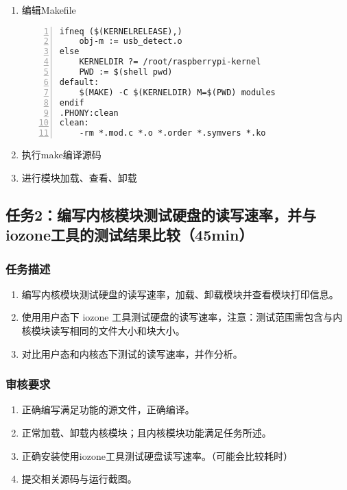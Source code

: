 \documentclass{article}
\begin{document}
\begin{enumerate}
\begin{lstlisting}[numbers=left]
\end{lstlisting}
	\item 编辑Makefile
	      \begin{lstlisting}[numbers=left]
ifneq ($(KERNELRELEASE),)
	obj-m := usb_detect.o
else
	KERNELDIR ?= /root/raspberrypi-kernel
	PWD := $(shell pwd)
default:
	$(MAKE) -C $(KERNELDIR) M=$(PWD) modules
endif
.PHONY:clean
clean:
	-rm *.mod.c *.o *.order *.symvers *.ko

\end{lstlisting}
	\item 执行make编译源码
	\item 进行模块加载、查看、卸载
\end{enumerate}

\newpage

\subsection{任务2：编写内核模块测试硬盘的读写速率，并与 iozone工具的测试结果比较（45min）}

\subsubsection{任务描述}
\begin{enumerate}
	\item 编写内核模块测试硬盘的读写速率，加载、卸载模块并查看模块打印信息。
	\item 使用用户态下 iozone 工具测试硬盘的读写速率，注意：测试范围需包含与内核模块读写相同的文件大小和块大小。
	\item 对比用户态和内核态下测试的读写速率，并作分析。
\end{enumerate}

\subsubsection{审核要求}
\begin{enumerate}
	\item 正确编写满足功能的源文件，正确编译。
	\item 正常加载、卸载内核模块；且内核模块功能满足任务所述。
	\item 正确安装使用iozone工具测试硬盘读写速率。（可能会比较耗时）
	\item 提交相关源码与运行截图。
\end{enumerate}
\end{document}

